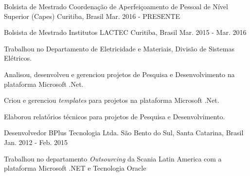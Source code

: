 

\begin{cventries}

  \cventry
    {Bolsista de Mestrado} %
    {Coordenação de Aperfeiçoamento de Pessoal de Nível Superior (Capes)} %
    {Curitiba, Brasil} %
    {Mar. 2016 - PRESENTE} %
    {
    }

  \cventry
    {Bolsista de Mestrado} %
    {Institutos LACTEC} %
    {Curitiba, Brasil} %
    {Mar. 2015 - Mar. 2016} %
    {
      \begin{cvitems} %
        \item {Trabalhou no Departamento de Eletricidade e Materiais, Divisão de Sistemas Elétricos.}
        \item {Analisou, desenvolveu e gerenciou projetos de Pesquisa e Desenvolvimento na plataforma Microsoft .Net.}
        \item {Criou e gerenciou \textit{templates} para projetos na plataforma Microsoft .Net.}
        \item {Elaborou relatórios técnicos para projetos de Pesquisa e Desenvolvimento.}
      \end{cvitems}
    }

  \cventry
    {Desenvolvedor} %
    {BPlus Tecnologia Ltda.} %
    {São Bento do Sul, Santa Catarina, Brasil} %
    {Jan. 2012 - Feb. 2015} %
    {
      \begin{cvitems} %
        \item {Trabalhou no departamento \textit{Outsourcing} da Scania Latin America com a plataforma Microsoft .NET e Tecnologia Oracle}
      \end{cvitems}
    }


\end{cventries}
